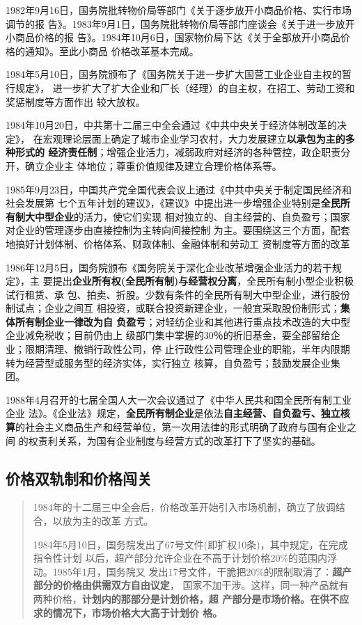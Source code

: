 1982年9月16日，国务院批转物价局等部门《关于逐步放开小商品价格、实行市场调节的报
告》。1983年9月1日，国务院批转物价局等部门座谈会《关于进一步放开小商品价格的报
告》。1984年10月6日，国家物价局下达《关于全部放开小商品价格的通知》。至此小商品
价格改革基本完成。\cite[442-443]{fengyunshi1b}


1984年5月10日，国务院颁布了《国务院关于进一步扩大国营工业企业自主权的暂行规定》，
进一步扩大了扩大企业和厂长（经理）的自主权，在招工、劳动工资和奖惩制度等方面作出
较大放权。

1984年10月20日，中共第十二届三中全会通过《中共中央关于经济体制改革的决定》，
在宏观理论层面上确定了城市企业学习农村，大力发展建立\textbf{以承包为主的多种形式的
经济责任制}；增强企业活力，减弱政府对经济的各种管控，政企职责分开，确立企业主
体地位；尊重价值规律及建立合理价格体系等。

1985年9月23日，中国共产党全国代表会议上通过《中共中央关于制定国民经济和社会发展第
七个五年计划的建议》，《建议》中提出进一步增强企业特别是\textbf{全民所有制大中型企业}的活力，使它们实现
相对独立的、自主经营的、自负盈亏；国家对企业的管理逐步由直接控制为主转向间接控制
为主。要围绕这三个方面，配套地搞好计划体制、价格体系、财政体制、金融体制和劳动工
资制度等方面的改革

1986年12月5日，国务院颁布《国务院关于深化企业改革增强企业活力的若干规定》，主
要提出\textbf{企业所有权(全民所有制)与经营权分离}，全民所有制小型企业积极试行租赁、承
包、拍卖、折股。少数有条件的全民所有制大中型企业，进行股份制试点；企业之间互
相投资，或联合投资新建企业，一般宜采取股份制形式；\textbf{集体所有制企业一律改为自
  负盈亏}；对轻纺企业和其他进行重点技术改造的大中型企业减免税收；目前仍由上
级部门集中掌握的30％的折旧基金，要全部留给企业；限期清理、撤销行政性公司，停
止行政性公司管理企业的职能，半年内限期转为经营型或服务型的经济实体，实行独立
核算，自负盈亏；鼓励发展企业集团。

1988年4月召开的七届全国人大一次会议通过了《中华人民共和国全民所有制工业企业
法》。《企业法》规定，\textbf{全民所有制企业}是依法\textbf{自主经营、自负盈亏、独立核
  算}的社会主义商品生产和经营单位，第一次用法律的形式明确了政府与国有企业之间
的权责利关系，为国有企业制度与经营方式的改革打下了坚实的基础。


\subsection{价格双轨制和价格闯关}
\label{sec:qishuanggui}

\begin{quotation}
  1984年的十二届三中全会后，价格改革开始引入市场机制，确立了放调结合，以放为主的改革
  方式。\cite{wangqiangshehui}

  1984年5月10日，国务院发出了67号文件(即扩权10条)，其中规定，在完成指令性计划
  以后，超产部分允许企业在不高于计划价格20\%的范围内浮动。1985年1月，国务院又
  发出17号文件，干脆把20\%的限制取消了：\textbf{超产部分的价格由供需双方自由议定}，
  国家不加干涉。这样，同一种产品就有两种价格，\textbf{计划内的那部分是计划价格，超
    产部分是市场价格。在供不应求的情况下，市场价格大大高于计划价
    格。}\cite{yangshuanggui}
\end{quotation}

